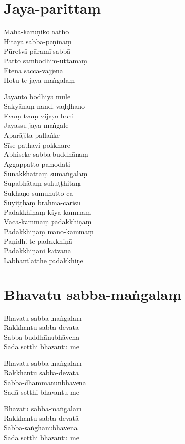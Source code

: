 \chapter{Jaya-parittaṃ}%


\begin{paritta}
Mahā-kāruṇiko nātho\\
Hitāya sabba-pāṇinaṃ\\
Pūretvā pāramī sabbā\\
Patto sambodhim-uttamaṃ\\
Etena sacca-vajjena\\
Hotu te jaya-maṅgalaṃ

Jayanto bodhiyā mūle\\
Sakyānaṃ nandi-vaḍḍhano\\
Evaṃ tvaṃ vijayo hohi\\
Jayassu jaya-maṅgale\\
Aparājita-pallaṅke\\
Sīse paṭhavi-pokkhare\\
Abhiseke sabba-buddhānaṃ\\
Aggappatto pamodati\\
Sunakkhattaṃ sumaṅgalaṃ\\
Supabhātaṃ suhuṭṭhitaṃ\\
Sukhaṇo sumuhutto ca\\
Suyiṭṭhaṃ brahma-cārisu\\
Padakkhiṇaṃ kāya-kammaṃ\\
Vācā-kammaṃ padakkhiṇaṃ\\
Padakkhiṇaṃ mano-kammaṃ\\
Paṇidhi te padakkhiṇā\\
Padakkhiṇāni katvāna\\
Labhant'atthe padakkhiṇe

\end{paritta}

\chapter{Bhavatu sabba-maṅgalaṃ}%


\begin{paritta}
Bhavatu sabba-maṅgalaṃ\\
Rakkhantu sabba-devatā\\
Sabba-buddhānubhāvena\\
Sadā sotthi bhavantu me

Bhavatu sabba-maṅgalaṃ\\
Rakkhantu sabba-devatā\\
Sabba-dhammānunbhāvena\\
Sadā sotthi bhavantu me

Bhavatu sabba-maṅgalaṃ\\
Rakkhantu sabba-devatā\\
Sabba-saṅghānubhāvena\\
Sadā sotthi bhavantu me
\end{paritta}


